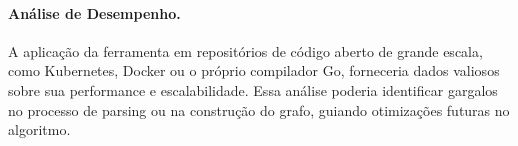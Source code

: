 \documentclass[12pt]{article}
\begin{document}
\paragraph{Análise de Desempenho.} A aplicação da ferramenta em repositórios de código aberto de grande escala, como Kubernetes, Docker ou o próprio compilador Go, forneceria dados valiosos sobre sua performance e escalabilidade. Essa análise poderia identificar gargalos no processo de parsing ou na construção do grafo, guiando otimizações futuras no algoritmo.



\end{document}
